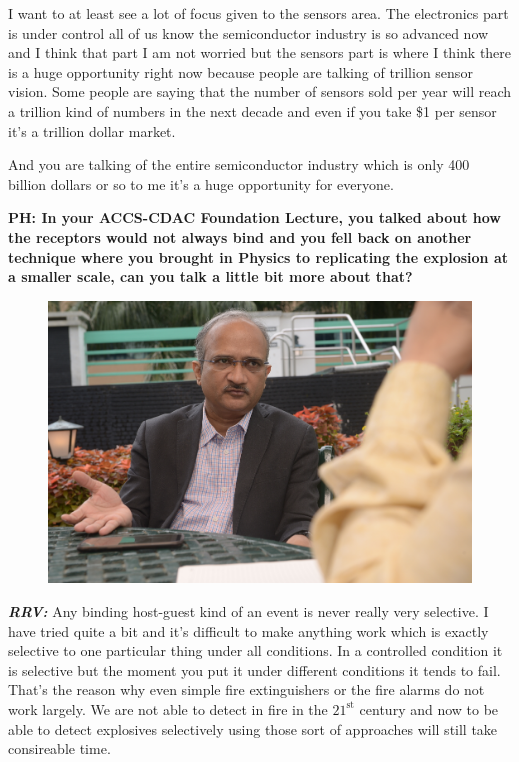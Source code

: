 \begin{multicols}{2}
I want to at least see a lot of focus given to the sensors area. The electronics part is under control all of us know the semiconductor industry is so advanced now and I think that part I am not worried but the sensors part is where I think there is a huge opportunity right now because people are talking of trillion sensor vision. Some people are saying that the number of sensors sold per year will reach a trillion kind of numbers in the next decade and even if you take \$1 per sensor it’s a trillion dollar market.

And you are talking of the entire semiconductor industry which is only 400 billion dollars or so to me it’s a huge opportunity for everyone.

\textbf{PH: In your ACCS-CDAC Foundation Lecture, you talked about how the receptors would not always bind and you fell back on another technique where you brought in Physics to replicating the explosion at a smaller scale, can you talk a little bit more about that?}

\begin{figure}[H]
\centering
\includegraphics[scale=.59]{src/Figures/interview/interview-fig13.jpg}
\vspace{-.5cm}
\end{figure}

\textbf{\textit{RRV:}} Any binding host-guest kind of an event is never really very selective. I have tried quite a bit and it’s difficult to make anything work which is exactly selective to one particular thing under all conditions. In a controlled condition it is selective but the moment you put it under different conditions it tends to fail. That’s the reason why even simple fire extinguishers or the fire alarms do not work largely. We are not able to detect in fire in the $21^{\text{st}}$ century and now to be able to detect explosives selectively using those sort of approaches will still take consireable time.


\end{multicols}

